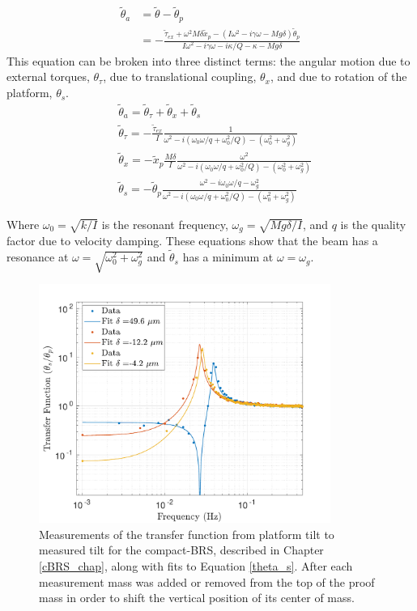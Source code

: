 \documentclass [12pt, proquest]{uwthesis}[2019]
\begin{document}
\begin{align}
\tilde{\theta}_a &=\tilde{\theta}-\tilde{\theta}_p\\
&= -\frac{\tilde{\tau}_{ex}+\omega^2 M \delta \tilde{x}_p- (I\omega^2-i\gamma \omega -Mg\delta) \tilde{\theta}_p}{I\omega^2-i \gamma \omega -i \kappa /Q-\kappa -Mg\delta}
\end{align}
This equation can be broken into three distinct terms: the angular motion due to external torques, $\theta_\tau$, due to translational coupling, $\theta_x$, and due to rotation of the platform, $\theta_s$.
\begin{align}
&\tilde{\theta}_a =\tilde{\theta}_\tau+\tilde{\theta}_x+\tilde{\theta}_{s} \label{theta_A} \\ 
&\tilde{\theta}_\tau= -\frac{\tilde{\tau}_{ex}}{I}\frac{1}{\omega^2-i (\omega_0 \omega/q+\omega_0^2/Q)-(\omega_0^2+\omega_g^2)}\\
&\tilde{\theta}_x= -\tilde{x}_p\frac{M\delta}{I} \frac{\omega^2}{\omega^2-i (\omega_0 \omega/q+\omega_0^2/Q)-(\omega_0^2+\omega_g^2)}\\
&\tilde{\theta}_{s}= -\tilde{\theta}_p\frac{\omega^2-i\omega_0 \omega/q-\omega_g^2}{\omega^2-i (\omega_0 \omega/q+\omega_0^2/Q)-(\omega_0^2+\omega_g^2)}\label{theta_s}
\end{align}

Where $\omega_0=\sqrt{k/I}$ is the resonant frequency, $\omega_g=\sqrt{M g \delta/I}$, and $q$ is the quality factor due to velocity damping. These equations show that the beam has a resonance at $\omega=\sqrt{\omega_0^2+\omega_g^2}$ and $\tilde{\theta}_s$ has a minimum at $\omega=\omega_g$. 


\begin{figure}[!h]
\begin{center}
 \includegraphics[width=0.85\textwidth]{cBRS_TransferFunction.pdf}
\caption[Transfer function from platform tilt to measured tilt for the cBRS]{Measurements of the transfer function from platform tilt to measured tilt for the compact-BRS, described in Chapter \ref{cBRS_chap}, along with fits to Equation \ref{theta_s}. After each measurement mass was added or removed from the top of the proof mass in order to shift the vertical position of its center of mass.}
\label{TransferFunction}
\end{center}
\end{figure}
\end{document}
